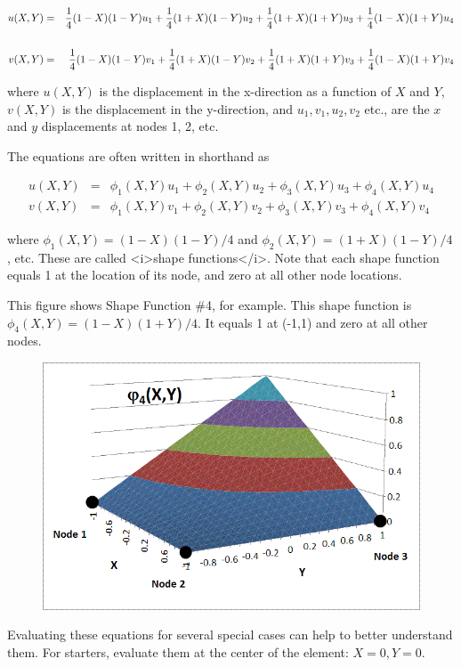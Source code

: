 \begin{eqnarray*}
u(X,Y) & = & {1\over 4}(1-X)(1-Y)u_1 + {1\over 4}(1+X)(1-Y)u_2 + {1\over 4}(1+X)(1+Y)u_3 + {1\over 4}(1-X)(1+Y)u_4 \\
\\
v(X,Y) & = & {1\over 4}(1-X)(1-Y)v_1 + {1\over 4}(1+X)(1-Y)v_2 + {1\over 4}(1+X)(1+Y)v_3 + {1\over 4}(1-X)(1+Y)v_4 \\
\end{eqnarray*}

where $ u(X,Y) $ is the displacement in the x-direction as a function of $ X $ and $ Y $,  $ v(X,Y) $ is the displacement in the y-direction, and $ u_1, v_1, u_2, v_2 $ etc., are the $ x $ and $ y $ displacements at nodes 1, 2, etc.

The equations are often written in shorthand as

\begin{eqnarray*}
u(X,Y) & = & \phi_1(X,Y) u_1 +  \phi_2(X,Y) u_2 +  \phi_3(X,Y) u_3 +  \phi_4(X,Y) u_4
\\
v(X,Y) & = & \phi_1(X,Y) v_1 +  \phi_2(X,Y) v_2 +  \phi_3(X,Y) v_3 +  \phi_4(X,Y) v_4
\end{eqnarray*}

where $ \phi_1(X,Y) = (1 - X)(1 - Y)/4 $ and $ \phi_2(X,Y) = (1 + X)(1 - Y)/4 $, etc. These are called <i>shape functions</i>.  Note that each shape function equals 1 at the location of its node, and zero at all other node locations.

This figure shows Shape Function \#4, for example. This shape function is $ \phi_4(X,Y) = (1 - X)(1 + Y)/4 $.  It equals 1 at (-1,1) and zero at  all other nodes.

\begin{figure}[h]
\centering
\includegraphics[width=0.7\linewidth]{figure/shape_function_4}
\caption{}
\label{fig:shape_function_4}
\end{figure}

Evaluating these equations for several special cases can help to better understand them.  For starters, evaluate them at the center of the element: $ X=0, Y=0 $.

